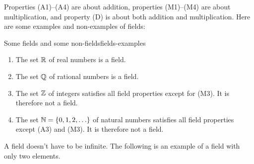 Properties (A1)--(A4) are about addition, properties (M1)--(M4) are
about multiplication, and property (D) is about both addition and
multiplication. Here are some examples and non-examples of fields:

\begin{example}{Some fields and some non-fields}{fields-examples}
  \begin{enumialphparenastyle}
    \begin{enumerate}
    \item The set $\mathbb{R}$ of real numbers is a field.
    \item The set $\mathbb{Q}$ of rational numbers is a field.
    \item The set $\mathbb{Z}$ of integers satisfies all field
      properties except for (M3). It is therefore not a field.
    \item The set $\mathbb{N}=\left\{0,1,2,\ldots\right\}$ of natural numbers
      satisfies all field properties except (A3) and (M3). It is
      therefore not a field.
    \end{enumerate}
  \end{enumialphparenastyle}
\end{example}

A field doesn't have to be infinite. The following is an example of a
field with only two elements.

